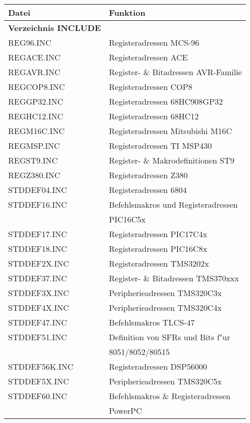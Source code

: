 \documentclass[12pt,a4paper,twoside]{report}
\begin{document}
\begin{table*}[htp]
\begin{center}\begin{tabular}{|l|l|}
\hline
Datei             & Funktion \\
\hline
\hline
{\bf Verzeichnis INCLUDE} & \\
\hline
REG96.INC         & Registeradressen MCS-96 \\
REGACE.INC        & Registeradressen ACE \\
REGAVR.INC        & Register- \& Bitadressen AVR-Familie \\
REGCOP8.INC       & Registeradressen COP8 \\
REGGP32.INC       & Registeradressen 68HC908GP32 \\
REGHC12.INC       & Registeradressen 68HC12 \\
REGM16C.INC       & Registeradressen Mitsubishi M16C \\
REGMSP.INC        & Registeradressen TI MSP430 \\
REGST9.INC        & Register- \& Makrodefinitionen ST9 \\
REGZ380.INC       & Registeradressen Z380 \\
STDDEF04.INC      & Registeradressen 6804 \\
STDDEF16.INC      & Befehlsmakros und Registeradressen \\
                  & PIC16C5x \\
STDDEF17.INC      & Registeradressen PIC17C4x \\
STDDEF18.INC      & Registeradressen PIC16C8x \\
STDDEF2X.INC      & Registeradressen TMS3202x \\
STDDEF37.INC      & Register- \& Bitadressen TMS370xxx \\
STDDEF3X.INC      & Peripherieadressen TMS320C3x \\
STDDEF4X.INC      & Peripherieadressen TMS320C4x \\
STDDEF47.INC      & Befehlsmakros TLCS-47 \\
STDDEF51.INC      & Definition von SFRs und Bits f"ur \\
                  & 8051/8052/80515 \\
STDDEF56K.INC     & Registeradressen DSP56000 \\
STDDEF5X.INC      & Peripherieadressen TMS320C5x \\
STDDEF60.INC      & Befehlsmakros \& Registeradressen \\
                  & PowerPC \\

\end{tabular}
\end{center}
\end{table*}
\end{document}
